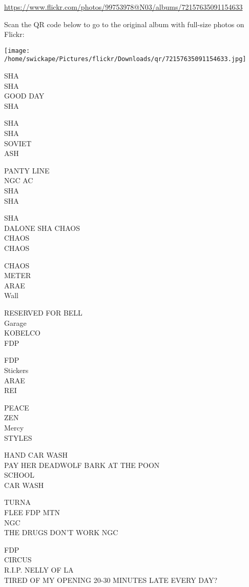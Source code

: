 \documentclass[10pt,letterpaper]{article}
\begin{document}
\url{https://www.flickr.com/photos/99753978@N03/albums/72157635091154633}

Scan the QR code below to go to the original album with full-size photos on Flickr:

\texttt{[image: /home/swickape/Pictures/flickr/Downloads/qr/72157635091154633.jpg]}


SHA\\
SHA\\
GOOD DAY\\
SHA

SHA\\
SHA\\
SOVIET\\
ASH

PANTY LINE\\
NGC AC\\
SHA\\
SHA

SHA\\
DALONE SHA CHAOS\\
CHAOS\\
CHAOS

CHAOS\\
METER\\
ARAE\\
Wall

RESERVED FOR BELL\\
Garage\\
KOBELCO\\
FDP

FDP\\
Stickers\\
ARAE\\
REI

PEACE\\
ZEN\\
Mercy\\
STYLES

HAND CAR WASH\\
PAY HER DEADWOLF BARK AT THE POON\\
SCHOOL\\
CAR WASH

TURNA\\
FLEE FDP MTN\\
NGC\\
THE DRUGS DON'T WORK NGC

FDP\\
CIRCUS\\
R.I.P. NELLY OF LA\\
TIRED OF MY OPENING 20{-}30 MINUTES LATE EVERY DAY?
\end{document}
